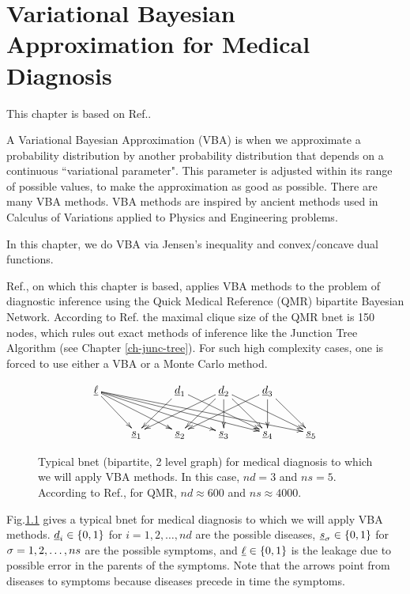 \chapter{Variational Bayesian Approximation
for Medical Diagnosis}
\label{ch-var-bay-medical}

This chapter is based
on Ref.\cite{jaak-jordan}.

A Variational Bayesian Approximation (VBA)
is when we approximate
a probability distribution
by another 
probability distribution that depends
on a continuous ``variational parameter". 
This parameter is
adjusted 
within its range of possible values,
to make the approximation
as good as possible.
There are many VBA methods.
VBA methods are inspired by 
ancient  methods
used in Calculus 
of Variations applied to Physics
and Engineering problems.

In this chapter,
we do VBA  via
Jensen's inequality and
convex/concave dual functions.

Ref.\cite{jaak-jordan}, on which
this chapter is based,
applies VBA methods to the problem of diagnostic inference using the Quick Medical Reference (QMR) bipartite Bayesian Network. 
According to Ref.\cite{jaak-jordan} 
the maximal clique size of the QMR 
bnet is
150 nodes, which rules out exact methods
of inference like the Junction Tree Algorithm
(see Chapter \ref{ch-junc-tree}).
For such high complexity cases,
one is forced to use
either a VBA or a Monte Carlo method.

\begin{figure}[h!]
$$\xymatrix{
\ul{\ell}
\ar[dr]\ar[drr]\ar[drrr]\ar[drrrr]\ar[drrrrr]
&
&\rvd_1\ar[dl]\ar[drr]
&\rvd_2\ar[dll]\ar[dl]\ar[dr]\ar[d]\ar[drr]
&\rvd_3\ar[dll]\ar[d]\ar[dr]
\\
&\rvs_1
&\rvs_2
&\rvs_3
&\rvs_4
&\rvs_5
}$$
\caption{
Typical bnet (bipartite, 2 level graph) 
for medical diagnosis
to which we will apply VBA
methods.
In this case, $nd=3$ and
$ns=5$. 
According to Ref.\cite{jaak-jordan},
for QMR, $nd\approx 600$ 
and $ns\approx 4000$.
}
\label{fig-var-bay-med-bnet}
\end{figure}

Fig.\ref{fig-var-bay-med-bnet}
gives a typical bnet
for medical diagnosis
to which we will apply VBA methods.
${\underline{d}}_i\in \{0,1\}$
for $i=1,2, \ldots, nd$
are the possible diseases,
${\underline{s}}_\sigma\in\{0,1\}$ 
for $\sigma=1,2, \ldots, ns$ are the possible
symptoms, and $\underline{\ell}\in\{0,1\}$
is the leakage  due to 
possible error in 
the parents of the symptoms.
Note that the 
arrows point from
diseases to symptoms
because diseases precede
in time
the symptoms.

